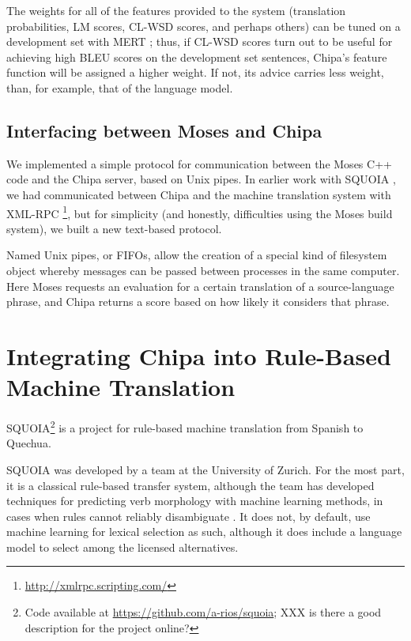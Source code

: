 The weights for all of the features provided to the system (translation
probabilities, LM scores, CL-WSD scores, and perhaps others) can be tuned on a
development set with MERT \cite{och:2003:ACL}; thus, if CL-WSD scores turn out
to be useful for achieving high BLEU scores on the development set sentences,
Chipa's feature function will be assigned a higher weight. If not, its advice
carries less weight, than, for example, that of the language model.


\subsection{Interfacing between Moses and Chipa}
We implemented a simple protocol for communication between the Moses C++ code
and the Chipa server, based on Unix pipes. In earlier work with SQUOIA
\cite{rudnick:saltmil2014}, we had communicated between Chipa and the machine
translation system with XML-RPC \footnote{\url{http://xmlrpc.scripting.com/}},
but for simplicity (and honestly, difficulties using the Moses build system),
we built a new text-based protocol.

Named Unix pipes, or FIFOs, allow the creation of a special kind of filesystem
object whereby messages can be passed between processes in the same computer.
Here Moses requests an evaluation for a certain translation of a
source-language phrase, and Chipa returns a score based on how likely it
considers that phrase.

\section{Integrating Chipa into Rule-Based Machine Translation}
SQUOIA\footnote{Code available at \url{https://github.com/a-rios/squoia};
XXX is there a good description for the project online?}
is a project for rule-based machine translation from Spanish to Quechua.

SQUOIA was developed by a team at the University of Zurich. For the most
part, it is a classical rule-based transfer system, although the team has
developed techniques for predicting verb morphology with machine
learning methods, in cases when rules cannot reliably disambiguate
\cite{riosgonzales-gohring:2013:HyTra}. It does not, by default, use machine
learning for lexical selection as such, although it does include a language
model to select among the licensed alternatives.

